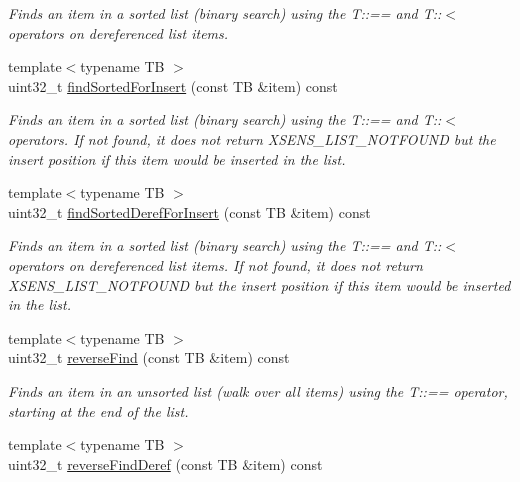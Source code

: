 \begin{DoxyCompactItemize}
\begin{DoxyCompactList}\small\item\em \-Finds an item in a sorted list (binary search) using the \-T\-:\-:== and \-T\-:\-:$<$ operators on dereferenced list items. \end{DoxyCompactList}\item 
\hypertarget{classxsens_1_1List_a5089a5617d417c9fe7b1566fc459eebd}{{\footnotesize template$<$typename T\-B $>$ }\\uint32\-\_\-t \hyperlink{classxsens_1_1List_a5089a5617d417c9fe7b1566fc459eebd}{find\-Sorted\-For\-Insert} (const \-T\-B \&item) const }\label{classxsens_1_1List_a5089a5617d417c9fe7b1566fc459eebd}

\begin{DoxyCompactList}\small\item\em \-Finds an item in a sorted list (binary search) using the \-T\-:\-:== and \-T\-:\-:$<$ operators. \-If not found, it does not return \-X\-S\-E\-N\-S\-\_\-\-L\-I\-S\-T\-\_\-\-N\-O\-T\-F\-O\-U\-N\-D but the insert position if this item would be inserted in the list. \end{DoxyCompactList}\item 
\hypertarget{classxsens_1_1List_a096bcac8f14358729c4355498695851d}{{\footnotesize template$<$typename T\-B $>$ }\\uint32\-\_\-t \hyperlink{classxsens_1_1List_a096bcac8f14358729c4355498695851d}{find\-Sorted\-Deref\-For\-Insert} (const \-T\-B \&item) const }\label{classxsens_1_1List_a096bcac8f14358729c4355498695851d}

\begin{DoxyCompactList}\small\item\em \-Finds an item in a sorted list (binary search) using the \-T\-:\-:== and \-T\-:\-:$<$ operators on dereferenced list items. \-If not found, it does not return \-X\-S\-E\-N\-S\-\_\-\-L\-I\-S\-T\-\_\-\-N\-O\-T\-F\-O\-U\-N\-D but the insert position if this item would be inserted in the list. \end{DoxyCompactList}\item 
\hypertarget{classxsens_1_1List_a55391498ac4ae44a937bf48bc970506f}{{\footnotesize template$<$typename T\-B $>$ }\\uint32\-\_\-t \hyperlink{classxsens_1_1List_a55391498ac4ae44a937bf48bc970506f}{reverse\-Find} (const \-T\-B \&item) const }\label{classxsens_1_1List_a55391498ac4ae44a937bf48bc970506f}

\begin{DoxyCompactList}\small\item\em \-Finds an item in an unsorted list (walk over all items) using the \-T\-:\-:== operator, starting at the end of the list. \end{DoxyCompactList}\item 
\hypertarget{classxsens_1_1List_a097dadec142b4801420f775d2182ffb0}{{\footnotesize template$<$typename T\-B $>$ }\\uint32\-\_\-t \hyperlink{classxsens_1_1List_a097dadec142b4801420f775d2182ffb0}{reverse\-Find\-Deref} (const \-T\-B \&item) const }\label{classxsens_1_1List_a097dadec142b4801420f775d2182ffb0}


\end{DoxyCompactItemize}
